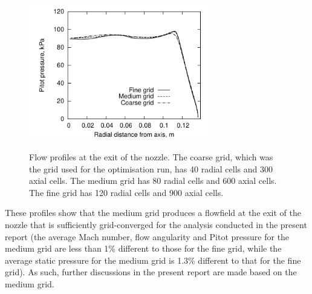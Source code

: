 \documentclass[12pt,a4paper]{article}
\begin{document}
\begin{figure}[htbp]
\begin{center}
{   \includegraphics[width=7.9cm]{plots/profile-Pitot.pdf}
   \label{f:nozzle-exit-Pitot-pressure}
  }
  \caption{Flow profiles at the exit of the nozzle. The coarse grid, which 
           was the grid used for the optimisation run, has 40 radial cells 
           and 300 axial cells. The medium grid has 80 radial cells and 600 
           axial cells. The fine grid has 120 radial cells and 900 axial 
           cells.}
  \label{f:nozzle-exit-profiles}
 \end{center}
\end{figure}
%
These profiles show that the medium grid produces a flowfield at the 
exit of the nozzle that is sufficiently grid-converged for the analysis 
conducted in the present report (the average Mach number, flow angularity 
and Pitot pressure for the medium grid are less than 1\% different to 
those for the fine grid, while the average static pressure for the medium 
grid is 1.3\% different to that for the fine grid). As such, further 
discussions in the present report are made based on the medium grid.
\end{document}
